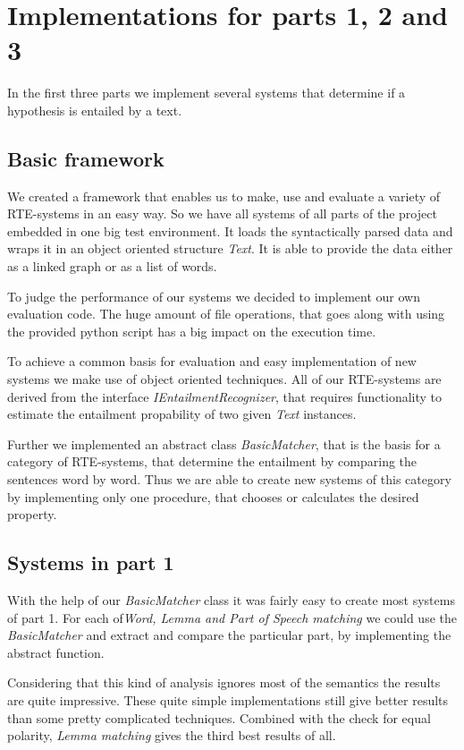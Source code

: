
\section{Implementations for parts 1, 2 and 3}

In the first three parts we implement several systems that determine if 
a hypothesis is entailed by a text.


\subsection{Basic framework}

We created a framework that enables us to make, use and evaluate
a variety of RTE-systems in an easy way. So we have all systems of all parts
of the project embedded in one big test environment.
It loads the syntactically parsed data and wraps it in an object oriented structure 
\textit{Text}. It is able to provide the data either as a linked graph or as a 
list of words.

To judge the performance of our systems we decided to implement our own evaluation
code. The huge amount of file operations, that goes along with using the provided 
python script has a big impact on the execution time.

To achieve a common basis for evaluation and easy implementation of new systems we make use of 
object oriented techniques. All of our RTE-systems are derived from the interface
\textit{IEntailmentRecognizer}, that requires functionality to estimate the entailment
propability of two given \textit{Text} instances.

Further we implemented an abstract class \textit{BasicMatcher}, that is the basis for a
category of RTE-systems, that determine the entailment by comparing the sentences word by word.
Thus we are able to create new systems of this category by implementing only one procedure, 
that chooses or calculates the desired property.

\subsection{Systems in part 1}

With the help of our \textit{BasicMatcher} class it was fairly easy to create most systems
of part 1. For each of\textit{Word, Lemma and Part of Speech matching} we could use the 
\textit{BasicMatcher} and extract and compare the particular part, by implementing the
abstract function.

Considering that this kind of analysis ignores most of the semantics the results are quite
impressive. These quite simple implementations still give better results than some 
pretty complicated techniques. Combined with the check for equal polarity, 
\textit{Lemma matching} gives the third best results of all.

